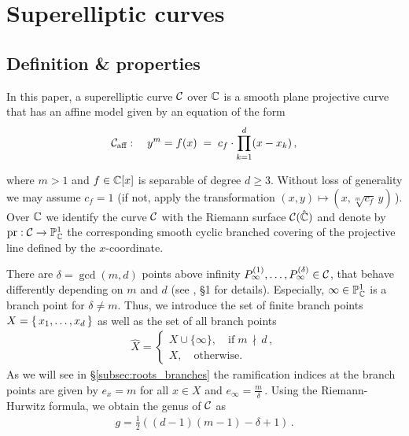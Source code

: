 \documentclass[main.tex]{subfiles}
\begin{document}
  \section{Superelliptic curves}\label{sec:se_curves}

  \subsection{Definition \& properties}
    
    \begin{defn}\label{def:se_curve}
    In this paper, a superelliptic curve $\mathcal{C}$ over $\mathbb{C}$ is a smooth plane projective curve that has an affine model given by an equation of the form 
   \begin{align}\label{eq:aff_model}
    \mathcal{C}_{\text{aff}} : \quad y^m = f(x) \;= \; c_f \cdot \prod_{k=1}^d (x-x_k)\,,
   \end{align}
   \end{defn}
   where $m > 1$ and $f \in \mathbb{C}[x]$ is separable of degree $d \ge 3$. 
   Without loss of generality we may assume $c_f = 1$ (if not, apply the transformation $(x,y) \mapsto (x,\sqrt[m]{c_f}\,y)$\,).  \abstand
   Over $\mathbb{C}$ we identify the curve $\mathcal{C}$ with the Riemann surface $\mathcal{C}(\hat{\mathbb{C}})$ and denote by $\operatorname{pr} : \mathcal{C} \rightarrow \mathbb{P}^1_{\mathbb{C}}$ the corresponding smooth cyclic branched covering of the projective line
   defined by the $x$-coordinate.
   
  There are $\delta = \gcd(m,d)$ points above infinity $P_{\infty}^{(1)},\dots,P_{\infty}^{(\delta)} \in \mathcal{C}$, that behave differently depending on $m$ and $d$ (see \cite{CT1996}, \S 1 for details). 
  Especially, $\infty \in \mathbb{P}^1_{\mathbb{C}}$ is a branch point for $\delta \ne m$. Thus, we introduce the set of finite branch points $X = \{ \, x_1,\dots,x_d \,\}$ as well as the set of all branch points
  \vspace{-0.3cm}
  \begin{align}\label{eq:branch_points}
         \hat{X} = \begin{cases}   X \cup \{ \infty \}, \quad \text{if} \; m \, \nmid \, d\,,\\
         X,\quad \text{otherwise.}
     \end{cases}
  \end{align} 
  As we will see in \S \ref{subsec:roots_branches} the ramification indices at the branch points are given by $e_x = m$ for all $x \in X$ and $e_{\infty} = \frac{m}{\delta}$\,. Using the
  Riemann-Hurwitz formula, we obtain the genus of $\mathcal{C}$ as
   \vspace{-0.3cm}
  \begin{align}\label{eq:genus}
    g = \frac{1}{2}( (d-1)(m-1) - \delta + 1)\,.
  \end{align}
\end{document}
